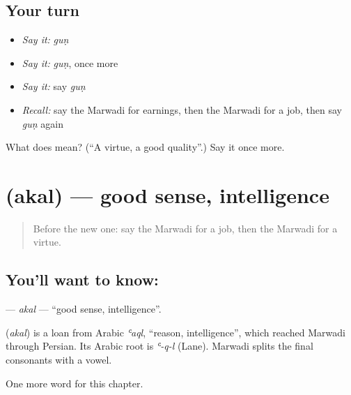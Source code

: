 \subsection*{Your turn}
\begin{itemize}
\raggedright
  \item \emph{Say it:} \emph{guṇ}
  \item \emph{Say it:} \emph{guṇ}, once more
  \item \emph{Say it:} say \emph{guṇ}
  \item \emph{Recall:} say the Marwadi for earnings, then the Marwadi for a job, then say \emph{guṇ} again
\end{itemize}

\begin{tcolorbox}[breakable,colback=teal!4,colframe=teal!35!black,title={Before you move on}]
What does  mean? (\textquotedblleft{}A virtue, a good quality\textquotedblright{}.) Say it once more.
\end{tcolorbox}
\section[\texorpdfstring{\mw{अकल} (akal)}{अकल (akal)}]{ (akal) — good sense, intelligence}

\label{lesson:MW-C116-akal}



\begin{quote}
Before the new one: say the Marwadi for a job, then the Marwadi for a virtue.
\end{quote}

\subsection*{You'll want to know: }
\textbf{} — \emph{akal} — \textquotedblleft{}good sense, intelligence\textquotedblright{}.

\begin{cousinweb}
\textbf{} (\emph{akal}) is a loan from Arabic \emph{ʿaql}, \textquotedblleft{}reason, intelligence\textquotedblright{}, which reached Marwadi through Persian. Its Arabic root is \emph{ʿ-q-l} (Lane). Marwadi splits the final consonants with a vowel.
\end{cousinweb}

\begin{grammarlens}[title={What you've built}]
One more word for this chapter.
\end{grammarlens}

